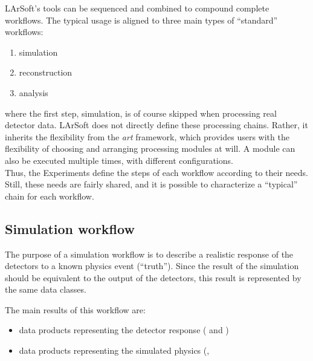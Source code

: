 
LArSoft's tools can be sequenced and combined to compound complete workflows.
The typical usage is aligned to three main types of ``standard'' workflows: %
\begin{enumerate}
  \item simulation
  \item reconstruction
  \item analysis
\end{enumerate}
where the first step, simulation, is of course skipped when processing real detector data.
LArSoft does not directly define these processing chains.
Rather, it inherits the flexibility from the \emph{art} framework,
which provides users with the flexibility of choosing and arranging
processing modules at will. %
A module can also be executed multiple times, with different configurations.\\
Thus, the Experiments define the steps of each workflow according to their
needs.
Still, these needs are fairly shared,
and it is possible to characterize a ``typical'' chain for each workflow.


\subsection{Simulation workflow}
\label{ssec:Workflows:Simulation}

The purpose of a simulation workflow is to describe a realistic response of
the detectors to a known physics event (``truth'').
Since the result of the simulation should be equivalent to the output of the detectors,
this result is represented by the same data classes.

The main results of this workflow are:
\begin{itemize}
	\item data products representing the detector response (\eg {} and )
	\item data products representing the simulated physics (\eg {}, 
\end{itemize}

